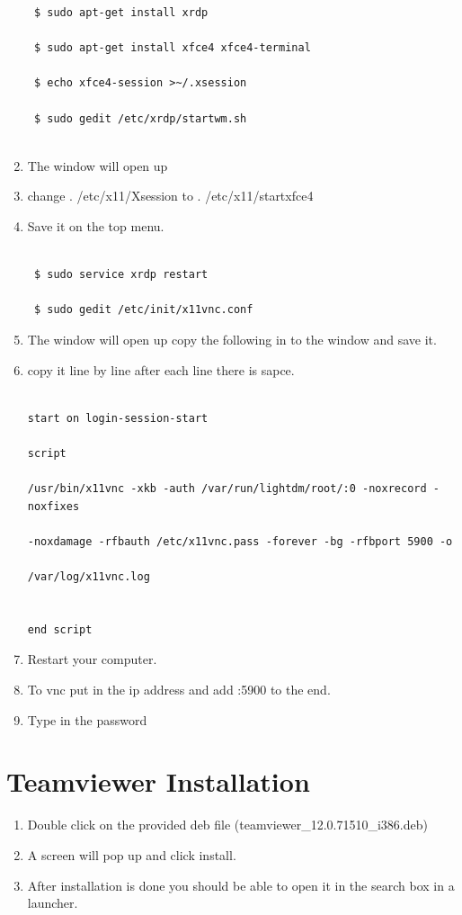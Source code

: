 \documentclass[12pt]{article}
\begin{document}
\begin{enumerate}
\begin{lstlisting}
 $ sudo apt-get install xrdp

 $ sudo apt-get install xfce4 xfce4-terminal

 $ echo xfce4-session >~/.xsession

 $ sudo gedit /etc/xrdp/startwm.sh


\end{lstlisting}

     \item The window will open up
     \item change . /etc/x11/Xsession to . /etc/x11/startxfce4
     \item Save it on the top menu.
\begin{lstlisting}

 $ sudo service xrdp restart

 $ sudo gedit /etc/init/x11vnc.conf

\end{lstlisting}
     \item The window will open up copy the following in to the window and save it.
     \item copy it line by line after each line there is sapce.
\begin{lstlisting}

start on login-session-start

script

/usr/bin/x11vnc -xkb -auth /var/run/lightdm/root/:0 -noxrecord -noxfixes

-noxdamage -rfbauth /etc/x11vnc.pass -forever -bg -rfbport 5900 -o

/var/log/x11vnc.log


end script

\end{lstlisting}
     \item Restart your computer.
     \item To vnc put in the ip address and add :5900 to the end.
     \item Type in the password
\end{enumerate}
\newpage
\section{Teamviewer Installation}\label{Teamviewer Installation}
\begin{enumerate}
     \item Double click on the provided deb file (teamviewer\_12.0.71510\_i386.deb)
     \item A screen will pop up and click install.

     \item After installation is done you should be able to open it in the search box in a launcher.
\end{enumerate}
\newpage
\end{document}
